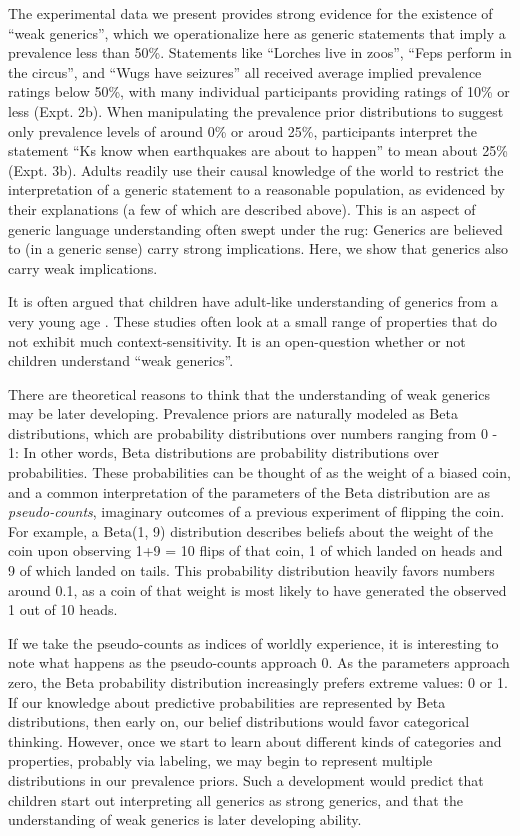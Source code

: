 \documentclass[floatsintext,doc]{apa6}
\theoremstyle{definition}
\theoremstyle{definition}
\theoremstyle{definition}
\theoremstyle{remark}
\begin{document}
The experimental data we present provides strong evidence for the
existence of \enquote{weak generics}, which we operationalize here as
generic statements that imply a prevalence less than 50\%. Statements
like \enquote{Lorches live in zoos}, \enquote{Feps perform in the
circus}, and \enquote{Wugs have seizures} all received average implied
prevalence ratings below 50\%, with many individual participants
providing ratings of 10\% or less (Expt. 2b). When manipulating the
prevalence prior distributions to suggest only prevalence levels of
around 0\% or aroud 25\%, participants interpret the statement
\enquote{Ks know when earthquakes are about to happen} to mean about
25\% (Expt. 3b). Adults readily use their causal knowledge of the world
to restrict the interpretation of a generic statement to a reasonable
population, as evidenced by their explanations (a few of which are
described above). This is an aspect of generic language understanding
often swept under the rug: Generics are believed to (in a generic sense)
carry strong implications. Here, we show that generics also carry weak
implications.

It is often argued that children have adult-like understanding of
generics from a very young age
. These studies often look
at a small range of properties that do not exhibit much
context-sensitivity. It is an open-question whether or not children
understand \enquote{weak generics}.

There are theoretical reasons to think that the understanding of weak
generics may be later developing. Prevalence priors are naturally
modeled as Beta distributions, which are probability distributions over
numbers ranging from 0 - 1: In other words, Beta distributions are
probability distributions over probabilities. These probabilities can be
thought of as the weight of a biased coin, and a common interpretation
of the parameters of the Beta distribution are as \emph{pseudo-counts},
imaginary outcomes of a previous experiment of flipping the coin. For
example, a Beta(1, 9) distribution describes beliefs about the weight of
the coin upon observing 1+9 = 10 flips of that coin, 1 of which landed
on heads and 9 of which landed on tails. This probability distribution
heavily favors numbers around 0.1, as a coin of that weight is most
likely to have generated the observed 1 out of 10 heads.

If we take the pseudo-counts as indices of worldly experience, it is
interesting to note what happens as the pseudo-counts approach 0. As the
parameters approach zero, the Beta probability distribution increasingly
prefers extreme values: 0 or 1. If our knowledge about predictive
probabilities are represented by Beta distributions, then early on, our
belief distributions would favor categorical thinking. However, once we
start to learn about different kinds of categories and properties,
probably via labeling, we may begin to represent multiple distributions
in our prevalence priors. Such a development would predict that children
start out interpreting all generics as strong generics, and that the
understanding of weak generics is later developing ability.
\end{document}
